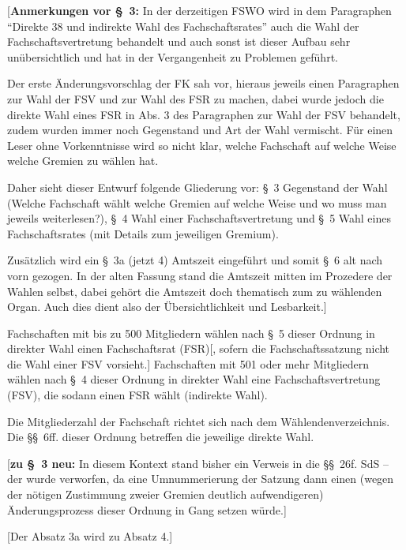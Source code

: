 \documentclass[%
draft,%
multilinesections%
]{fswo}
\newcommand\newT[1]  {{\color{Green}[#1]}}
\newcommand\bemFr[1] {{\color{Red}[#1]}}
\newcommand\bemFe[1] {{\color{Cyan}[#1]}}
\newcommand\newT[1]{#1}
\newcommand\bemFr[1]{}%
\newcommand\bemFe[1]{}%
\begin{document}
\bemFr{\textbf{Anmerkungen vor \S~3:} In der derzeitigen FSWO wird in dem Paragraphen \enquote{Direkte 38 und indirekte Wahl des Fachschaftsrates} auch die Wahl der Fachschaftsvertretung behandelt und auch sonst ist dieser Aufbau sehr unübersichtlich und hat in der Vergangenheit zu Problemen geführt.

Der erste Änderungsvorschlag der FK sah vor, hieraus jeweils einen Paragraphen zur Wahl der FSV und zur Wahl des FSR zu machen, dabei wurde jedoch die direkte Wahl eines FSR in Abs. 3 des Paragraphen zur Wahl der FSV behandelt, zudem wurden immer noch Gegenstand und Art der Wahl vermischt.
Für einen Leser ohne Vorkenntnisse wird so nicht klar, welche Fachschaft auf welche Weise welche Gremien zu wählen hat.

Daher sieht dieser Entwurf folgende Gliederung vor:
\S~3 Gegenstand der Wahl (Welche Fachschaft wählt welche Gremien auf welche Weise und wo muss man jeweils weiterlesen?), \S~4 Wahl einer Fachschaftsvertretung und \S~5 Wahl eines Fachschaftsrates (mit Details zum jeweiligen Gremium).

Zusätzlich wird ein \S~3a (jetzt 4) Amtszeit eingeführt und somit \S~6 alt nach vorn gezogen. In der alten Fassung stand die Amtszeit mitten im Prozedere der Wahlen selbst, dabei gehört die Amtszeit doch thematisch zum zu wählenden Organ. Auch dies dient also der Übersichtlichkeit und Lesbarkeit.}

\begin{contract}
Fachschaften mit bis zu 500 Mitgliedern wählen nach \S~5 dieser Ordnung in direkter Wahl einen Fachschaftsrat (FSR)\newT{, sofern die Fachschaftssatzung nicht die Wahl einer FSV vorsieht.}
Fachschaften mit 501 oder mehr Mitgliedern wählen nach \S~4 dieser Ordnung in direkter Wahl eine Fachschaftsvertretung (FSV), die sodann einen FSR wählt (indirekte Wahl).

Die Mitgliederzahl der Fachschaft richtet sich nach dem Wählendenverzeichnis.
Die \S\S~6ff. dieser Ordnung betreffen die jeweilige direkte Wahl.
\end{contract}

\bemFr{\textbf{zu \S~3 neu:} In diesem Kontext stand bisher ein Verweis in die \S\S~26f. SdS – der wurde verworfen, da eine Umnummerierung der Satzung dann einen (wegen der nötigen Zustimmung zweier Gremien deutlich aufwendigeren) Änderungsprozess dieser Ordnung in Gang setzen würde.}

\bemFe{Der Absatz 3a wird zu Absatz 4.}
\end{document}
